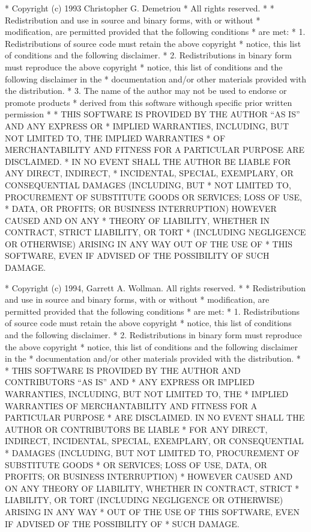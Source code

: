 \begin{copyrightEnv}
 * Copyright (c) 1993 Christopher G. Demetriou
 * All rights reserved.
 *
 * Redistribution and use in source and binary forms, with or without
 * modification, are permitted provided that the following conditions
 * are met:
 * 1. Redistributions of source code must retain the above copyright
 *    notice, this list of conditions and the following disclaimer.
 * 2. Redistributions in binary form must reproduce the above copyright
 *    notice, this list of conditions and the following disclaimer in the
 *    documentation and/or other materials provided with the distribution.
 * 3. The name of the author may not be used to endorse or promote products
 *    derived from this software withough specific prior written permission
 *
 * THIS SOFTWARE IS PROVIDED BY THE AUTHOR ``AS IS'' AND ANY EXPRESS OR
 * IMPLIED WARRANTIES, INCLUDING, BUT NOT LIMITED TO, THE IMPLIED WARRANTIES
 * OF MERCHANTABILITY AND FITNESS FOR A PARTICULAR PURPOSE ARE DISCLAIMED.
 * IN NO EVENT SHALL THE AUTHOR BE LIABLE FOR ANY DIRECT, INDIRECT,
 * INCIDENTAL, SPECIAL, EXEMPLARY, OR CONSEQUENTIAL DAMAGES (INCLUDING, BUT
 * NOT LIMITED TO, PROCUREMENT OF SUBSTITUTE GOODS OR SERVICES; LOSS OF USE,
 * DATA, OR PROFITS; OR BUSINESS INTERRUPTION) HOWEVER CAUSED AND ON ANY
 * THEORY OF LIABILITY, WHETHER IN CONTRACT, STRICT LIABILITY, OR TORT
 * (INCLUDING NEGLIGENCE OR OTHERWISE) ARISING IN ANY WAY OUT OF THE USE OF
 * THIS SOFTWARE, EVEN IF ADVISED OF THE POSSIBILITY OF SUCH DAMAGE.
\end{copyrightEnv}

\begin{copyrightEnv}
 * Copyright (c) 1994, Garrett A. Wollman.  All rights reserved.
 *
 * Redistribution and use in source and binary forms, with or without
 * modification, are permitted provided that the following conditions
 * are met:
 * 1. Redistributions of source code must retain the above copyright
 *    notice, this list of conditions and the following disclaimer.
 * 2. Redistributions in binary form must reproduce the above copyright
 *    notice, this list of conditions and the following disclaimer in the
 *    documentation and/or other materials provided with the distribution.
 *
 * THIS SOFTWARE IS PROVIDED BY THE AUTHOR AND CONTRIBUTORS ``AS IS'' AND
 * ANY EXPRESS OR IMPLIED WARRANTIES, INCLUDING, BUT NOT LIMITED TO, THE
 * IMPLIED WARRANTIES OF MERCHANTABILITY AND FITNESS FOR A PARTICULAR PURPOSE
 * ARE DISCLAIMED.  IN NO EVENT SHALL THE AUTHOR OR CONTRIBUTORS BE LIABLE
 * FOR ANY DIRECT, INDIRECT, INCIDENTAL, SPECIAL, EXEMPLARY, OR CONSEQUENTIAL
 * DAMAGES (INCLUDING, BUT NOT LIMITED TO, PROCUREMENT OF SUBSTITUTE GOODS
 * OR SERVICES; LOSS OF USE, DATA, OR PROFITS; OR BUSINESS INTERRUPTION)
 * HOWEVER CAUSED AND ON ANY THEORY OF LIABILITY, WHETHER IN CONTRACT, STRICT
 * LIABILITY, OR TORT (INCLUDING NEGLIGENCE OR OTHERWISE) ARISING IN ANY WAY
 * OUT OF THE USE OF THIS SOFTWARE, EVEN IF ADVISED OF THE POSSIBILITY OF
 * SUCH DAMAGE.
\end{copyrightEnv}

